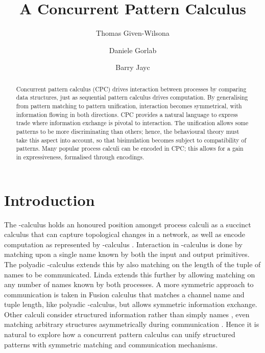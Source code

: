 \documentclass{LMCS}
\title[A Concurrent Pattern Calculus]{A Concurrent Pattern Calculus\rsuper*}
\author[T.~Given-Wilson]{Thomas Given-Wilson\rsuper a}	\address{{\lsuper a}INRIA, Paris, France}	\email{thomas.given-wilson@inria.fr}  \thanks{{\lsuper a}The first author has been partially supported by the project ANR-12-IS02-001 PACE}
\author[D.~Gorla]{Daniele Gorla\rsuper b}	\address{{\lsuper b}Dip.~di Informatica, ``Sapienza'' Universit\`a di Roma}	\email{gorla@di.uniroma1.it}
\author[B.~Jay]{Barry Jay\rsuper c}	\address{{\lsuper c}University of Technology, Sydney}	\email{Barry.Jay@uts.edu.au}
\begin{document}
\makeatactive





\maketitle  

\begin{abstract}
Concurrent pattern calculus (CPC) drives interaction between processes by
  comparing data structures, just as sequential pattern calculus
  drives computation. By generalising from pattern matching to pattern
  unification, interaction becomes symmetrical, with information
  flowing in both directions.
  CPC provides a natural language to express trade where information
  exchange is pivotal to interaction.
The unification allows some patterns to be more discriminating than
  others; hence, the behavioural theory must take this aspect into
  account, so that bisimulation becomes subject to compatibility of patterns.
Many popular process calculi can be encoded in CPC; this allows for a
  gain in expressiveness, formalised through encodings.

\end{abstract} 

\section{Introduction}
\label{sec:intro}



The -calculus \cite{milner.parrow.ea:calculus-mobile,sangiorgi.walker:theory-mobile} 
holds an honoured position amongst process calculi as a succinct calculus that can capture topological changes in a network, as well as encode computation as represented by -calculus \cite{Barendregt85}.
Interaction in -calculus is done by matching upon a single name known by both the input and output primitives.
The polyadic -calculus extends this by also matching on the length of the tuple of names to be communicated.
Linda \cite{Gel85} extends this further by allowing matching on any number of names known by both processes.
A more symmetric approach to communication is taken in Fusion calculus \cite{parrow.victor:fusion-calculus} 
that matches a channel name and tuple length, like polyadic -calculus, but allows symmetric information exchange.
Other calculi consider structured information rather than simply names \cite{gordon1997ccp},
even matching arbitrary structures asymmetrically during communication \cite{BJPV11}.
Hence it is natural to explore how a concurrent pattern calculus can unify structured patterns with symmetric matching and communication mechanisms.
\end{document}
